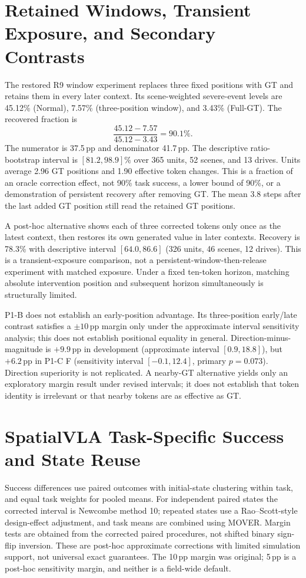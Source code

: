 \section{Retained Windows, Transient Exposure, and Secondary Contrasts}
\label{app:window}
The restored R9 window experiment replaces three fixed positions with GT and retains them in every later context. Its scene-weighted severe-event levels are 45.12\% (Normal), 7.57\% (three-position window), and 3.43\% (Full-GT). The recovered fraction is
\begin{equation}
\frac{45.12-7.57}{45.12-3.43}=90.1\%.
\end{equation}
The numerator is 37.5\,pp and denominator 41.7\,pp. The descriptive ratio-bootstrap interval is $[81.2,98.9]\%$ over 365 units, 52 scenes, and 13 drives. Units average 2.96 GT positions and 1.90 effective token changes. This is a fraction of an oracle correction effect, not 90\% task success, a lower bound of 90\%, or a demonstration of persistent recovery after removing GT. The mean 3.8 steps after the last added GT position still read the retained GT positions.

A post-hoc alternative shows each of three corrected tokens only once as the latest context, then restores its own generated value in later contexts. Recovery is 78.3\% with descriptive interval $[64.0,86.6]$ (326 units, 46 scenes, 12 drives). This is a transient-exposure comparison, not a persistent-window-then-release experiment with matched exposure. Under a fixed ten-token horizon, matching absolute intervention position and subsequent horizon simultaneously is structurally limited.

P1-B does not establish an early-position advantage. Its three-position early/late contrast satisfies a $\pm10$\,pp margin only under the approximate interval sensitivity analysis; this does not establish positional equality in general. Direction-minus-magnitude is $+9.9$\,pp in development (approximate interval $[0.9,18.8]$), but $+6.2$\,pp in P1-C F (sensitivity interval $[-0.1,12.4]$, primary $p=0.073$). Direction superiority is not replicated. A nearby-GT alternative yields only an exploratory margin result under revised intervals; it does not establish that token identity is irrelevant or that nearby tokens are as effective as GT.

\section{SpatialVLA Task-Specific Success and State Reuse}
\label{app:spatial}
Success differences use paired outcomes with initial-state clustering within task, and equal task weights for pooled means. For independent paired states the corrected interval is Newcombe method 10; repeated states use a Rao--Scott-style design-effect adjustment, and task means are combined using MOVER. Margin tests are obtained from the corrected paired procedures, not shifted binary sign-flip inversion. These are post-hoc approximate corrections with limited simulation support, not universal exact guarantees. The 10\,pp margin was original; 5\,pp is a post-hoc sensitivity margin, and neither is a field-wide default.

